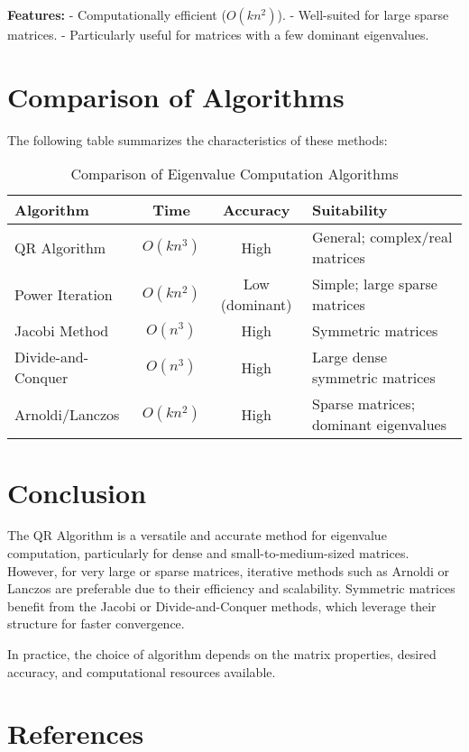 \documentclass[12pt]{article}
\begin{document}
\textbf{Features:}
- Computationally efficient (\( O(kn^2) \)).
- Well-suited for large sparse matrices.
- Particularly useful for matrices with a few dominant eigenvalues.

\section*{Comparison of Algorithms}
The following table summarizes the characteristics of these methods:

\begin{table}[h!]
\centering
\begin{tabular}{|l|c|c|l|}
\hline
\textbf{Algorithm}        & \textbf{Time} & \textbf{Accuracy} & \textbf{Suitability} \\ \hline
QR Algorithm              & \( O(kn^3) \) & High              & General; complex/real matrices \\ \hline
Power Iteration           & \( O(kn^2) \) & Low (dominant)    & Simple; large sparse matrices  \\ \hline
Jacobi Method             & \( O(n^3) \)  & High              & Symmetric matrices             \\ \hline
Divide-and-Conquer        & \( O(n^3) \)  & High              & Large dense symmetric matrices \\ \hline
Arnoldi/Lanczos           & \( O(kn^2) \) & High              & Sparse matrices; dominant eigenvalues \\ \hline
\end{tabular}
\label{tab:eigen-algorithms}
\caption{Comparison of Eigenvalue Computation Algorithms}
\end{table}

\section*{Conclusion}
The QR Algorithm is a versatile and accurate method for eigenvalue computation, particularly for dense and small-to-medium-sized matrices. However, for very large or sparse matrices, iterative methods such as Arnoldi or Lanczos are preferable due to their efficiency and scalability. Symmetric matrices benefit from the Jacobi or Divide-and-Conquer methods, which leverage their structure for faster convergence. 

In practice, the choice of algorithm depends on the matrix properties, desired accuracy, and computational resources available.


\section*{References}
\end{document}
